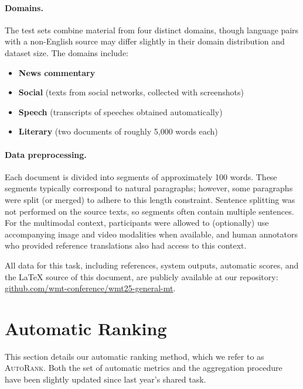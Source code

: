\documentclass[11pt]{article}
\newcommand{\auto}{\textsc{AutoRank}}
\begin{document}
\paragraph{Domains.} The test sets combine material from four distinct domains, though language pairs with a non-English source may differ slightly in their domain distribution and dataset size. The domains include:
\begin{itemize}
    \item \textbf{News commentary}
    \item \textbf{Social} (texts from social networks, collected with screenshots)
    \item \textbf{Speech} (transcripts of speeches obtained automatically)
    \item \textbf{Literary} (two documents of roughly 5{,}000 words each)
\end{itemize}

\paragraph{Data preprocessing.} Each document is divided into segments of approximately 100 words. These segments typically correspond to natural paragraphs; however, some paragraphs were split (or merged) to adhere to this length constraint. Sentence splitting was not performed on the source texts, so segments often contain multiple sentences. For the multimodal context, participants were allowed to (optionally) use accompanying image and video modalities when available, and human annotators who provided reference translations also had access to this context.

All data for this task, including references, system outputs, automatic scores, and the LaTeX source of this document, are publicly available at our repository: \href{https://github.com/wmt-conference/wmt25-general-mt}{github.com/wmt-conference/wmt25-general-mt}.






\section*{Automatic Ranking}
\label{sec:automatic-ranking}


This section details our automatic ranking method, which we refer to as \auto. 
Both the set of automatic metrics and the aggregation procedure have been slightly updated since last year's shared task.
\end{document}
